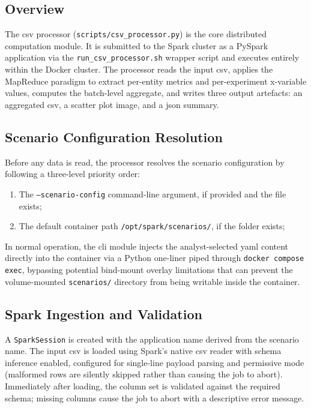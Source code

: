 \subsection{Overview}
\label{subsec:cap4-overview-2}

The \gls{csv} processor (\texttt{scripts/csv\_processor.py}) is the core distributed computation
module. It is submitted to the Spark cluster as a PySpark application \parencite{sparkpysparkdocs}
via the \texttt{run\_csv\_processor.sh} wrapper script and executes entirely within the Docker
cluster. The processor reads the input \gls{csv}, applies the MapReduce paradigm to extract
per-entity metrics and per-experiment x-variable values, computes the batch-level aggregate, and
writes three output artefacts: an aggregated \gls{csv}, a scatter plot image, and a \gls{json}
summary.

\subsection{Scenario Configuration Resolution}
\label{subsec:cap4-scenario-configuration-resolution}

Before any data is read, the processor resolves the scenario configuration by following a
three-level priority order:

\begin{enumerate}
    \item The \texttt{--scenario-config} command-line argument, if provided and the file exists;
    \item The default container path \texttt{/opt/spark/scenarios/}, if the folder exists;
\end{enumerate}

In normal operation, the \gls{cli} module injects the analyst-selected \gls{yaml} content
directly into the container via a Python one-liner piped through \texttt{docker compose exec},
bypassing potential bind-mount overlay limitations that can prevent the volume-mounted
\texttt{scenarios/} directory from being writable inside the container.

\subsection{Spark Ingestion and Validation}
\label{subsec:cap4-spark-ingestion-and-validation}

A \texttt{SparkSession} is created with the application name derived from the scenario name. The
input \gls{csv} is loaded using Spark's native \gls{csv} reader with schema inference enabled,
configured for single-line payload parsing and permissive mode (malformed rows are silently
skipped rather than causing the job to abort). Immediately after loading, the column set is
validated against the required schema; missing columns cause the job to abort with a descriptive
error message.

